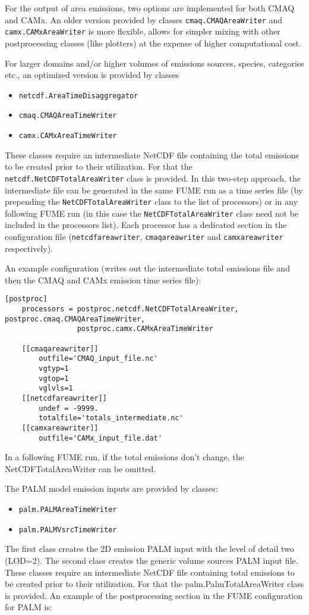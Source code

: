 \documentclass[a4paper,11pt]{article}
\begin{document}
For the output of area emissions, two options are implemented for both
CMAQ and CAMx. An older version provided by classes
\texttt{cmaq.CMAQAreaWriter} and \texttt{camx.CAMxAreaWriter} is more
flexible, allows for simpler mixing with other postprocessing classes
(like plotters) at the expense of higher computational cost.

For larger domains and/or higher volumes of emissions sources, species,
categories etc., an optimized version is provided by classes
\begin{itemize}
\item
  \verb|netcdf.AreaTimeDisaggregator|
\item
  \verb|cmaq.CMAQAreaTimeWriter|
\item
  \verb|camx.CAMxAreaTimeWriter|
\end{itemize}

These classes require an intermediate NetCDF file containing the total
emissions to be created prior to their utilization. For that the
\verb|netcdf.NetCDFTotalAreaWriter| class is provided. In this
two-step approach, the intermediate file can be generated in the same
FUME run as a time series file (by prepending the
\verb|NetCDFTotalAreaWriter| class to the list of processors) or in
any following FUME run (in this case the \verb|NetCDFTotalAreaWriter|
class need not be included in the processors list). Each processor has a
dedicated section in the configuration file (\verb|netcdfareawriter|,
\verb|cmaqareawriter| and \verb|camxareawriter| respectively).

An example configuration (writes out the intermediate total emissions file
and then the CMAQ and CAMx emission time series file):

\begin{verbatim}
[postproc]
    processors = postproc.netcdf.NetCDFTotalAreaWriter, postproc.cmaq.CMAQAreaTimeWriter, 
                 postproc.camx.CAMxAreaTimeWriter

    [[cmaqareawriter]]
        outfile='CMAQ_input_file.nc'
        vgtyp=1
        vgtop=1
        vglvls=1
    [[netcdfareawriter]]
        undef = -9999.
        totalfile='totals_intermediate.nc'
    [[camxareawriter]]
        outfile='CAMx_input_file.dat'
\end{verbatim}

In a following FUME run, if the total emissions don't change, the
NetCDFTotalAreaWriter can be omitted.

The PALM model emission inputs are provided by classes:
\begin{itemize}
\item
  \verb|palm.PALMAreaTimeWriter|
\item
  \verb|palm.PALMVsrcTimeWriter|
\end{itemize}
The first class creates the 2D emission PALM input with the level of detail two (LOD=2). The second class creates the generic volume sources PALM input file. These classes require an intermediate NetCDF file containing total emissions to be created prior to their utilization. For that the palm.PalmTotalAreaWriter class is provided. An example of the postprocessing section in the FUME configuration for PALM is:
\end{document}
